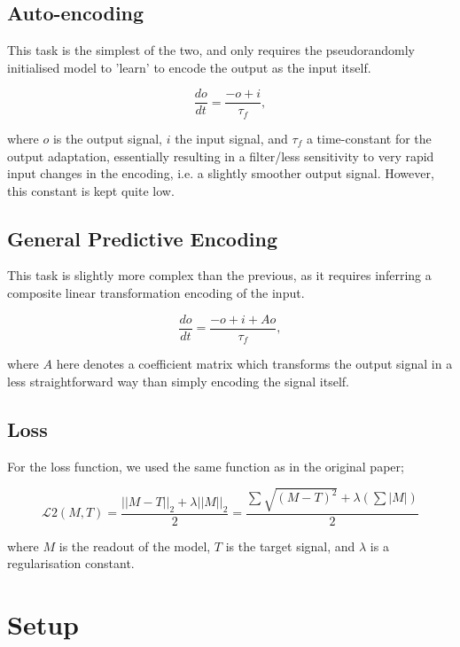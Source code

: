 \documentclass[mphil,deptreport,ianc]{infthesis} %
\begin{document}
\subsection{Auto-encoding}

This task is the simplest of the two, and only requires the pseudorandomly initialised model to 'learn' to encode the output as the input itself.

\begin{equation}
    \frac{do}{dt} = \frac{-o + i}{\tau_f},
\end{equation}

where $o$ is the output signal, $i$ the input signal, and $\tau_f$ a time-constant for the output adaptation, essentially resulting in a filter/less sensitivity to very rapid input changes in the encoding, i.e. a slightly smoother output signal. However, this constant is kept quite low.

\subsection{General Predictive Encoding}

This task is slightly more complex than the previous, as it requires inferring a composite linear transformation encoding of the input.

\begin{equation}
    \frac{do}{dt} = \frac{- o + i + Ao}{\tau_f},
\end{equation}

where $A$ here denotes a coefficient matrix which transforms the output signal in a less straightforward way than simply encoding the signal itself.


\subsection{Loss}

For the loss function, we used the same function as in the original paper;

\begin{equation}
    \mathcal{L} 2(M, T) = \frac{||M-T||_2 + \lambda ||M||_2}{2} = \frac{\sum \sqrt{(M-T)^2} + \lambda(\sum |M|)}{2}
\end{equation}

where $M$ is the readout of the model, $T$ is the target signal, and $\lambda$ is a regularisation constant.


\section{Setup}
\end{document}

